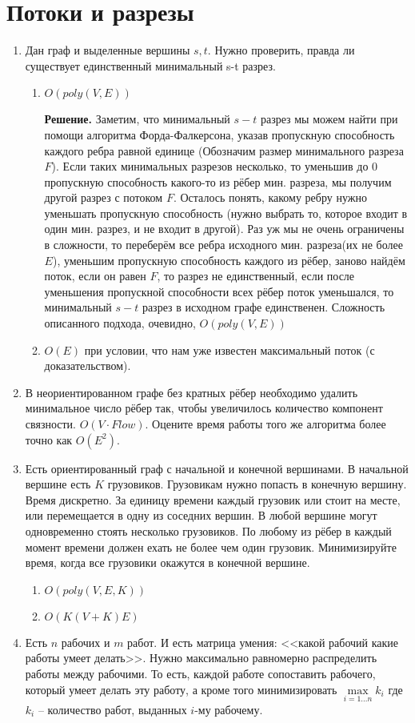 \section*{Потоки и разрезы}
\begin{enumerate}
	\item Дан граф и выделенные вершины $s, t$. Нужно проверить, правда ли существует единственный минимальный s-t разрез.
	\begin{enumerate}
		\item $O(poly(V, E))$
		
		\textbf{Решение.} Заметим, что минимальный $s-t$ разрез мы можем найти при помощи алгоритма 
		Форда-Фалкерсона, указав пропускную способность каждого ребра равной единице (Обозначим размер минимального 
		разреза $F$). Если таких минимальных разрезов несколько, то уменьшив до 0 пропускную способность какого-то 
		из рёбер мин. разреза, мы получим другой разрез с потоком $F$. Осталось понять, какому ребру нужно 
		уменьшать пропускную способность (нужно выбрать то, которое входит в один мин. разрез, и не входит в 
		другой). Раз уж мы не очень ограничены в сложности, то переберём все ребра исходного мин. разреза(их не 
		более $E$), уменьшим пропускную способность каждого из рёбер, заново найдём поток, если он равен $F$, то 
		разрез не единственный, если после уменьшения пропускной способности всех рёбер поток уменьшался, то 
		минимальный $s-t$ разрез в исходном графе единственен. Сложность описанного подхода, очевидно, $O(poly(V, 
		E))$
		\item $O(E)$ при условии, что нам уже известен максимальный поток (с доказательством).
	\end{enumerate}
	
	\item В неориентированном графе без кратных рёбер необходимо удалить минимальное число рёбер так, чтобы 
	увеличилось количество компонент связности. $O(V \cdot Flow)$. Оцените время работы	того же алгоритма более 
	точно как $O(E^2)$.
	
	\item Есть ориентированный граф с начальной и конечной вершинами. В начальной вершине есть $K$ грузовиков. 
	Грузовикам нужно попасть в конечную вершину. Время дискретно. За единицу времени каждый грузовик или стоит на 
	месте, или перемещается в одну из соседних вершин. В любой вершине могут одновременно стоять несколько 
	грузовиков. По любому из рёбер в каждый момент времени должен ехать не более чем один грузовик. Минимизируйте 
	время, когда все грузовики окажутся в конечной вершине.
	\begin{enumerate}
		\item $O(poly(V, E, K))$
		\item $O(K(V + K)E)$
	\end{enumerate}
	
	\item Есть $n$ рабочих и $m$ работ. И есть матрица умения: <<какой рабочий какие работы умеет делать>>. Нужно 
	максимально равномерно распределить работы между рабочими. То есть, каждой работе сопоставить рабочего, который 
	умеет делать эту работу, а кроме того минимизировать $\max\limits_{i=1\dots n} k_i$ где $k_i$ – количество 
	работ, выданных $i$-му рабочему.
\end{enumerate}
